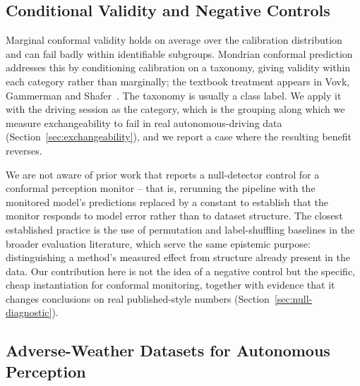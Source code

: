 \subsection{Conditional Validity and Negative Controls}
\label{sec:related-conditional}

Marginal conformal validity holds on average over the calibration
distribution and can fail badly within identifiable subgroups. Mondrian
conformal prediction~\cite{VovkMondrian2003} addresses this by conditioning
calibration on a taxonomy, giving validity within each category rather than
marginally; the textbook treatment appears in Vovk, Gammerman and
Shafer~\cite{VovkGammermanShafer2005}. The taxonomy is usually a class
label. We apply it with the driving session as the category, which is the
grouping along which we measure exchangeability to fail in real
autonomous-driving data (Section~\ref{sec:exchangeability}), and we report
a case where the resulting benefit reverses.

We are not aware of prior work that reports a null-detector control for a
conformal perception monitor -- that is, rerunning the pipeline with the
monitored model's predictions replaced by a constant to establish that the
monitor responds to model error rather than to dataset structure. The
closest established practice is the use of permutation and label-shuffling
baselines in the broader evaluation literature, which serve the same
epistemic purpose: distinguishing a method's measured effect from
structure already present in the data. Our contribution here is not the
idea of a negative control but the specific, cheap instantiation for
conformal monitoring, together with evidence that it changes conclusions on
real published-style numbers (Section~\ref{sec:null-diagnostic}).

\subsection{Adverse-Weather Datasets for Autonomous Perception}
\label{sec:related-datasets}

